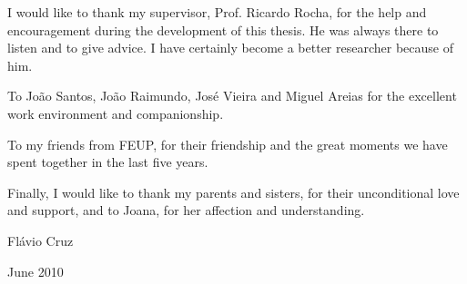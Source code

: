 I would like to thank my supervisor, Prof. Ricardo Rocha, for the help and encouragement during
the development of this thesis. He was always there to listen and to give advice. I have
certainly become a better researcher because of him.

To João Santos, João Raimundo, José Vieira and Miguel Areias for the excellent work environment
and companionship.

To my friends from FEUP, for their friendship and the great moments we have spent together in
the last five years. 

Finally, I would like to thank my parents and sisters, for their unconditional love and support,
and to Joana, for her affection and understanding.

\begin{flushright}
   Flávio Cruz
   
   June 2010
\end{flushright}